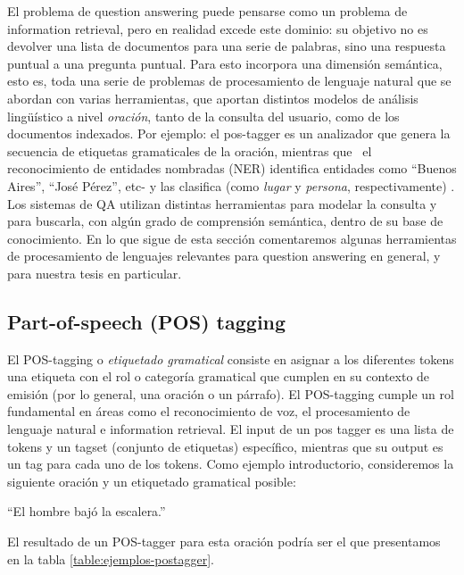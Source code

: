 El problema de question answering puede pensarse como un problema de information
retrieval, pero en realidad excede este dominio: su objetivo no es devolver una lista de documentos para
una serie de palabras, sino una respuesta puntual a una pregunta
puntual. Para esto incorpora una dimensión semántica, esto es, toda
una serie de problemas de procesamiento de lenguaje natural que se
abordan con varias herramientas, que aportan distintos modelos de
análisis lingüístico a nivel \textit{oración}, tanto de la
consulta del usuario, como de los documentos indexados. Por ejemplo: el
pos-tagger es un analizador que genera la secuencia de etiquetas gramaticales de la
oración, mientras que \ el reconocimiento de entidades nombradas
(NER) identifica entidades como {\textquotedblleft}Buenos
Aires{\textquotedblright}, {\textquotedblleft}José
Pérez{\textquotedblright}, etc- y las clasifica (como \textit{lugar}
y \textit{persona}, respectivamente) . Los sistemas de QA utilizan
distintas herramientas para modelar la consulta y para buscarla, con
algún grado de comprensión semántica, dentro de su base de
conocimiento.
En lo que sigue de esta sección comentaremos algunas herramientas de procesamiento de lenguajes relevantes para question answering en general, y para nuestra tesis en particular.

\subsection{Part-of-speech (POS) tagging}
\label{subsec:pos}

El POS-tagging o \textit{etiquetado gramatical} consiste en asignar a los diferentes
tokens una etiqueta con el rol o categoría gramatical que cumplen en su contexto de emisión (por lo general, una oración o un párrafo).
El POS-tagging cumple un rol fundamental en áreas como el reconocimiento de voz, el procesamiento de lenguaje natural e information retrieval.
El input de un pos tagger es una lista de tokens y un tagset (conjunto de etiquetas) específico, mientras que su output es un tag para cada uno
de los tokens. Como ejemplo introductorio, consideremos la siguiente oración y un etiquetado gramatical posible:

\begin{center}
{\textquotedblleft}El hombre bajó la escalera.{\textquotedblright}
\end{center}
\medskip

El resultado de un POS-tagger para esta oración podría ser el que presentamos en la tabla \ref{table:ejemplos-postagger}.

